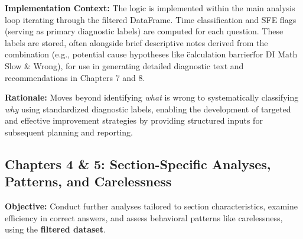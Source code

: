 \documentclass{article}
\begin{document}
\textbf{Implementation Context:} The logic is implemented within the main analysis loop iterating through the filtered DataFrame. Time classification and SFE flags (serving as primary diagnostic labels) are computed for each question. These labels are stored, often alongside brief descriptive notes derived from the combination (e.g., potential cause hypotheses like \"calculation barrier\" for DI Math Slow \& Wrong), for use in generating detailed diagnostic text and recommendations in Chapters 7 and 8.

\textbf{Rationale:} Moves beyond identifying \textit{what} is wrong to systematically classifying \textit{why} using standardized diagnostic labels, enabling the development of targeted and effective improvement strategies by providing structured inputs for subsequent planning and reporting.

\subsection{Chapters 4 \& 5: Section-Specific Analyses, Patterns, and Carelessness}

\textbf{Objective:} Conduct further analyses tailored to section characteristics, examine efficiency in correct answers, and assess behavioral patterns like carelessness, using the \textbf{filtered dataset}.
\end{document}
